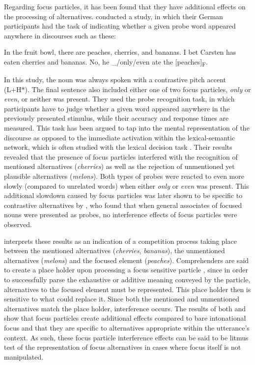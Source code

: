 \documentclass[output=paper,colorlinks,citecolor=brown]{langscibook}
\begin{document}
Regarding focus particles, it has been found that they have additional effects on the processing of alternatives. \citet{gotzner2016impact} conducted a study, in which their German participants had the task of indicating whether a given probe word appeared anywhere in discourses such as these: 

\ea\label{ex:ex3} In the fruit bowl, there are peaches, cherries, and bananas.
\ex\label{ex:ex4} I bet Carsten has eaten cherries and bananas.
\ex\label{ex:ex5} No, he \_/only/even ate the [peaches]\textsubscript{F}.
\z

In this study, the noun was always spoken with a contrastive pitch accent (L+H*). The final sentence also included either one of two focus particles, \textit{only} or \textit{even}, or neither was present. They used the probe recognition task, in which participants have to judge whether a given word appeared anywhere in the previously presented stimulus, while their accuracy and response times are measured. This task has been argued to tap into the mental representation of the discourse \citep{gernsbacher1995cataphoric} as opposed to the immediate activation within the lexical-semantic network, which is often studied with the lexical decision task \citep{meyer1971facilitation}. Their results revealed that the presence of focus particles interfered with the recognition of mentioned alternatives (\textit{cherries}) as well as the rejection of unmentioned yet plausible alternatives (\textit{melons}). Both types of probes were reacted to even more slowly (compared to unrelated words) when either \textit{only} or \textit{even} was present. This additional slowdown caused by focus particles was later shown to be specific to contrastive alternatives by \citet{gotzner2017role}, who found that when general associates of focused nouns were presented as probes, no interference effects of focus particles were observed. 

\citet{gotzner2017alternative} interprets these results as an indication of a competition process taking place between the mentioned alternatives (\textit{cherries}, \textit{bananas}), the unmentioned alternatives (\textit{melons}) and the focused element (\textit{peaches}). Comprehenders are said to create a place holder upon processing a focus sensitive particle \citep{gotzner2017alternative}, since in order to successfully parse the exhaustive or additive meaning conveyed by the particle, alternatives to the focused element must be represented. This place holder then is sensitive to what could replace it. Since both the mentioned and unmentioned alternatives match the place holder, interference occurs. The results of both \citet{gotzner2016impact} and \citet{gotzner2017role} show that focus particles create additional effects compared to bare intonational focus and that they are specific to alternatives appropriate within the utterance's context. As such, these focus particle interference effects can be said to be litmus test of the representation of focus alternatives in cases where focus itself is not manipulated.
\end{document}
